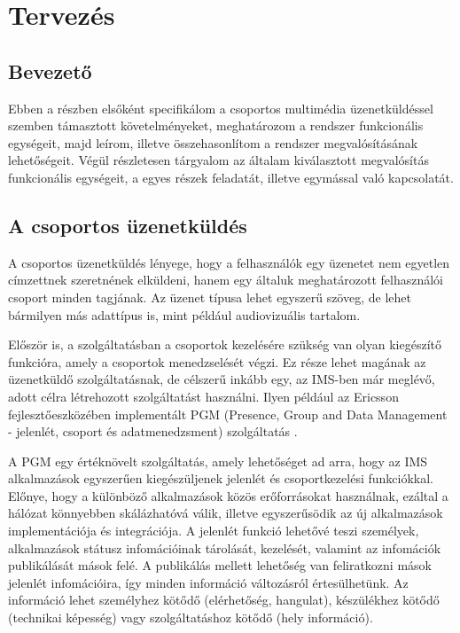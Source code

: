 \setcounter{tocdepth}{5}

\section{Tervezés}
\label{sec:tervezes}

\subsection{Bevezető}

Ebben a részben elsőként specifikálom a csoportos multimédia üzenetküldéssel szemben támasztott követelményeket, meghatározom a rendszer funkcionális egységeit, majd leírom, illetve összehasonlítom a rendszer megvalósításának lehetőségeit. Végül részletesen tárgyalom az általam kiválasztott megvalósítás funkcionális egységeit, a egyes részek feladatát, illetve egymással való kapcsolatát.

\subsection{A csoportos üzenetküldés}
\label{sec:group_messaging}

A csoportos üzenetküldés lényege, hogy a felhasználók egy üzenetet nem egyetlen címzettnek szeretnének elküldeni, hanem egy általuk meghatározott felhasználói csoport minden tagjának. Az üzenet típusa lehet egyszerű szöveg, de lehet bármilyen más adattípus is, mint például audiovizuális tartalom. 

Először is, a szolgáltatásban a csoportok kezelésére szükség van olyan kiegészítő funkcióra, amely a csoportok menedzselését végzi. Ez része lehet magának az üzenetküldő szolgáltatásnak, de célszerű inkább egy, az IMS-ben már meglévő, adott célra létrehozott szolgáltatást használni. Ilyen például az Ericsson fejlesztőeszközében implementált PGM (Presence, Group and Data Management - jelenlét, csoport és adatmenedzsment) szolgáltatás \cite{ericsson_pgm}.

A PGM egy értéknövelt szolgáltatás, amely lehetőséget ad arra, hogy az IMS alkalmazások egyszerűen kiegészüljenek jelenlét és csoportkezelési funkciókkal. Előnye, hogy a különböző alkalmazások közös erőforrásokat használnak, ezáltal a hálózat könnyebben skálázhatóvá válik, illetve egyszerűsödik az új alkalmazások implementációja és integrációja. A jelenlét funkció lehetővé teszi személyek, alkalmazások státusz infomációinak tárolását, kezelését, valamint az infomációk publikálását mások felé.
A publikálás mellett lehetőség van feliratkozni mások jelenlét infomációira, így minden információ változásról értesülhetünk. Az információ lehet személyhez kötődő (elérhetőség, hangulat), készülékhez kötődő (technikai képesség) vagy szolgáltatáshoz kötődő (hely információ).

